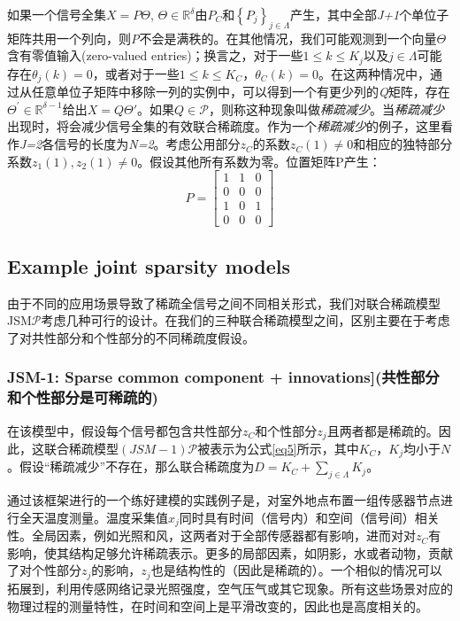 \documentclass[UTF8]{ctexart}
\theoremstyle{plain}
\theoremstyle{definition}
\theoremstyle{remark}
\newcommand{\upcite}[1]{\textsuperscript{\textsuperscript{\cite{#1}}}}
\begin{document}
	如果一个信号全集$X=P\Theta$, $\Theta\in\mathbb{R}^\delta$由$P_C$和$\left\{P_j\right\}_{j\in\Lambda}$产生，其中全部\emph{J+1}个单位子矩阵共用一个列向，则\emph{P}不会是满秩的。在其他情况，我们可能观测到一个向量$\Theta$含有零值输入(\textcolor[rgb]{1,0,0}{zero-valued entries})；换言之，对于一些$1\leq k\leq K_j$以及$j\in\Lambda$可能存在$\theta_j(k)=0$，或者对于一些$1\leq k \leq K_C$，$\theta_C(k)=0$。在这两种情况中，通过从任意单位子矩阵中移除一列的实例中，可以得到一个有更少列的\emph{Q}矩阵，存在$\Theta^\prime \in \mathbb{R}^{\delta -1}$给出$X=Q\Theta'$。如果$Q\in\mathcal{P}$，则称这种现象叫做\textcolor[rgb]{1,0,0}{\emph{稀疏减少}}。当\emph{稀疏减少}出现时，将会减少信号全集的有效联合稀疏度。作为一个\emph{稀疏减少}的例子，这里看作\emph{J=2}各信号的长度为\emph{N=2}。考虑公用部分$z_C$的系数$z_C(1)\neq0$和相应的独特部分系数$z_1(1),z_2(1)\neq0$。假设其他所有系数为零。位置矩阵P产生：
	\begin{equation*}
	P=\left[\begin{array}{cccc}
	1 & 1 & 0\\
	0 & 0 & 0\\
	1 & 0 & 1\\
	0 & 0 & 0
	\end{array}\right]
	\end{equation*}
	
	\subsection{Example joint sparsity models}
	由于不同的应用场景导致了稀疏全信号之间不同相关形式，我们对联合稀疏模型JSM$\mathcal{P}$考虑几种可行的设计。在我们的三种联合稀疏模型之间，区别主要在于考虑了对共性部分和个性部分的不同稀疏度假设。
	
	\subsubsection{JSM-1: Sparse common component + innovations](共性部分和个性部分是可稀疏的)}
	在该模型中，假设每个信号都包含共性部分$z_C$和个性部分$z_j$且两者都是稀疏的。因此，这联合稀疏模型$(JSM-1)\mathcal{P}$被表示为公式\cref{eq5}所示，其中$K_C$，$K_j$均小于$N$。假设“稀疏减少”不存在，那么联合稀疏度为$D=K_C+\sum_{j\in\Lambda}K_j$。
	
	通过该框架进行的一个练好建模的实践例子是，对室外地点布置一组传感器节点进行全天温度测量。温度采集值$x_j$同时具有时间（信号内）和空间（信号间）相关性。全局因素，例如光照和风，这两者对于全部传感器都有影响，进而对对$z_C$有影响，使其结构足够允许稀疏表示。更多的局部因素，如阴影，水或者动物，贡献了对个性部分$z_j$的影响，$z_j$也是结构性的（因此是稀疏的）。一个相似的情况可以拓展到，利用传感网络记录光照强度，空气压气或其它现象。所有这些场景对应的物理过程的测量特性，在时间和空间上是平滑改变的，因此也是高度相关的。\upcite{Estrin2002,Pottie2000}
	
\end{document}
